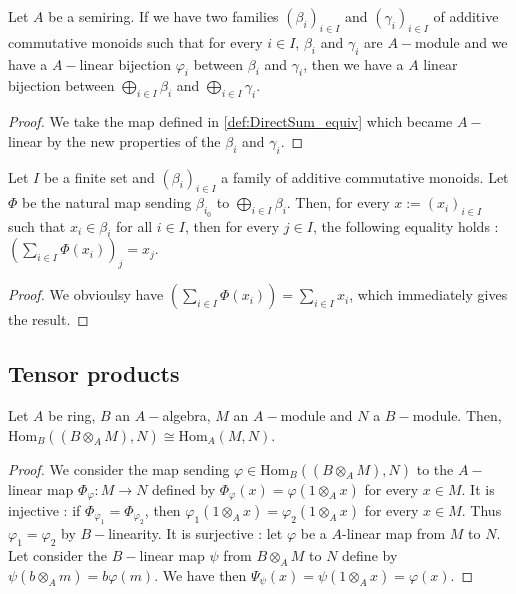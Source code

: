 \begin{definition}
    \label{def:DirectSum_equiv_linearmap}
    \leanok
    Let $A$ be a semiring. If we have two families $(\beta_i)_{i\in I}$ and $(\gamma_i)_{i\in I}$ of additive commutative
    monoids such that for every $i\in I$, $\beta_i$ and $\gamma_i$ are $A-$module and we have a $A-$linear bijection $\varphi_i$ between 
    $\beta_i$ and $\gamma_i$, then we have a $A$ linear bijection
    between $\bigoplus\limits_{i\in I}\beta_i$ and $\bigoplus\limits_{i\in I}\gamma_i$.
    \begin{proof}
        \leanok
        We take the map defined in \ref{def:DirectSum_equiv} which became $A-$linear by
        the new properties of the $\beta_i$ and $\gamma_i$.
    \end{proof}
\end{definition}

\begin{proposition}
    \label{prop:DirectSum_eq_sum_direct}
    \uses{}
    \leanok
    Let $I$ be a finite set and $(\beta_i)_{i\in I}$ a family of additive commutative monoids.
    Let $\Phi$ be the natural map sending $\beta_{i_0}$ to $\bigoplus\limits_{i\in I}\beta_i$.
    Then, for every $x:=(x_i)_{i\in I}$ such that $x_i\in\beta_i$ for all $i\in I$, then for every $j\in I$,
    the following equality holds : $\left(\sum\limits_{i\in I} \Phi(x_i)\right)_j=x_j$.
\end{proposition}
\begin{proof}
    \leanok
    We obvioulsy have $\left(\sum\limits_{i\in I} \Phi(x_i)\right)=\sum\limits_{i\in I}x_i$,
    which immediately gives the result.
\end{proof}

\subsection{Tensor products}

\begin{definition}
    \label{def:iso_hom_tens}
    \uses{}
    \leanok
    Let $A$ be ring, $B$ an $A-$algebra, $M$ an $A-$module and $N$ a $B-$module. Then,
    $\text{Hom}_B((B\otimes_AM),N)\cong \text{Hom}_A(M,N)$.
    \begin{proof}
        \leanok
        We consider the map sending $\varphi\in\text{Hom}_B((B\otimes_AM),N)$ to the $A-$linear map
        $\Phi_\varphi : M \rightarrow N$ defined by $\Phi_\varphi(x)=\varphi (1\otimes_A x)$ for every $x\in M$.
        It is injective : if $\Phi_{\varphi_1}=\Phi_{\varphi_2}$, then $\varphi_1(1\otimes_A x)=\varphi_2(1\otimes_A x)$
        for every $x\in M$. Thus $\varphi_1=\varphi_2$ by $B-$linearity.
        It is surjective : let $\varphi$ be a $A$-linear map from $M$ to $N$. Let consider the $B-$linear map
        $\psi$ from $B\otimes_AM$ to $N$ define by $\psi (b\otimes_A m) = b \varphi (m)$. We have then 
        $\Psi_\psi(x)=\psi (1\otimes_A x)= \varphi(x)$.

    \end{proof}
\end{definition}


